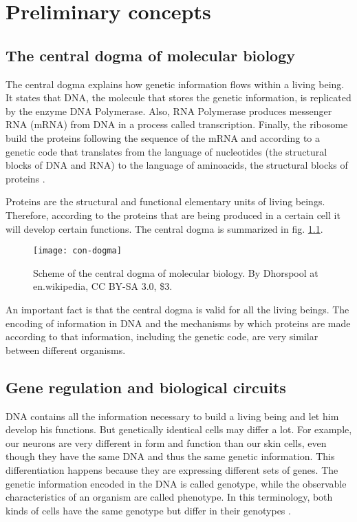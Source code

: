 \chapter{Preliminary concepts}


\section{The central dogma of molecular biology}

The central dogma explains how genetic information flows within a living being. It states that DNA, the molecule that stores the genetic information, is replicated by the enzyme DNA Polymerase. Also, RNA Polymerase produces messenger RNA (mRNA) from DNA in a process called transcription. Finally, the ribosome build the proteins following the sequence of the mRNA and according to a genetic code that translates from the language of nucleotides (the structural blocks of DNA and RNA) to the language of aminoacids, the structural blocks of proteins \cite{alberts13}.

Proteins are the structural and functional elementary units of living beings. Therefore, according to the proteins that are being produced in a certain cell it will develop certain functions. The central dogma is summarized in fig. \ref{fig:con-dogma}.

\begin{figure}[H]
  \centering
  \texttt{[image: con-dogma]}
  \caption[Central dogma of molecular biology]{\label{fig:con-dogma} Scheme of the central dogma of molecular biology. By Dhorspool at en.wikipedia, CC BY-SA 3.0, \$3.}
\end{figure}

An important fact is that the central dogma is valid for all the living beings. The encoding of information in DNA and the mechanisms by which proteins are made according to that information, including the genetic code, are very similar between different organisms.

\section{Gene regulation and biological circuits}

DNA contains all the information necessary to build a living being and let him develop his functions. But genetically identical cells may differ a lot. For example, our neurons are very different in form and function than our skin cells, even though they have the same DNA and thus the same genetic information. This differentiation happens because they are expressing different sets of genes. The genetic information encoded in the DNA is called genotype, while the observable characteristics of an organism are called phenotype. In this terminology, both kinds of cells have the same genotype but differ in their genotypes \cite{alberts13} \cite{alon06}.

